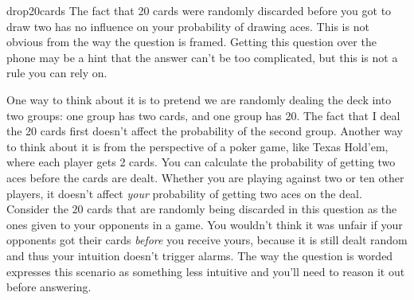 \begin{answer}{drop20cards}
The fact that 20 cards were randomly discarded before you got to draw two has no influence on your probability of drawing aces.
This is not obvious from the way the question is framed.
Getting this question over the phone may be a hint that the answer can't be too complicated, but this is not a rule you can rely on.


One way to think about it is to pretend we are randomly dealing the deck into two groups: one group has two cards, and one group has 20.
The fact that I deal the 20 cards first doesn't affect the probability of the second group.
Another way to think about it is from the perspective of a poker game, like Texas Hold'em, where each player gets 2 cards.
You can calculate the probability of getting two aces before the cards are dealt.
Whether you are playing against two or ten other players, it doesn't affect \emph{your} probability of getting two aces on the deal.
Consider the 20 cards that are randomly being discarded in this question as the ones given to your opponents in a game.
You wouldn't think it was unfair if your opponents got their cards \emph{before} you receive yours, because it is still dealt random and thus your intuition doesn't trigger alarms.
The way the question is worded expresses this scenario as something less intuitive and you'll need to reason it out before answering.



\end{answer}
